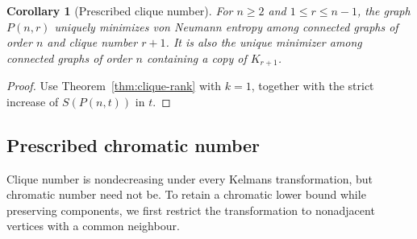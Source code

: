 \documentclass[11pt,a4paper,reqno]{amsart}
\newtheorem{corollary}[theorem]{Corollary}
\theoremstyle{remark}
\newcommand{\Ent}{S}
\newcommand{\Pine}{P}
\numberwithin{equation}{section}
\begin{document}
\begin{corollary}[Prescribed clique number]
\label{cor:prescribed-clique}
For $n\ge2$ and $1\le r\le n-1$, the graph $\Pine(n,r)$ uniquely
minimizes von Neumann entropy among connected graphs of order $n$ and
clique number $r+1$. It is also the unique minimizer among connected
graphs of order $n$ containing a copy of $K_{r+1}$.
\end{corollary}
\begin{proof}
Use Theorem~\ref{thm:clique-rank} with $k=1$, together with the strict
increase of $\Ent(\Pine(n,t))$ in $t$.
\end{proof}

\subsection{Prescribed chromatic number}

Clique number is nondecreasing under every Kelmans transformation,
but chromatic number need not be. To retain a chromatic lower bound
while preserving components, we first restrict the transformation to
nonadjacent vertices with a common neighbour.
\end{document}
